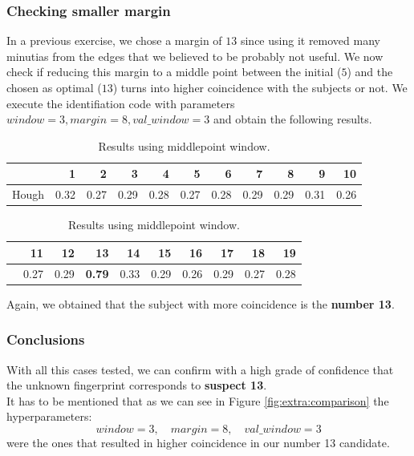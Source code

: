 \documentclass[a4paper]{article}
\begin{document}
\subsubsection{Checking smaller margin}

In a previous exercise, we chose a margin of \(13\) since using it removed many minutias from the edges that we believed to be probably not useful. We now check if reducing this margin to a middle point between the initial  (\(5\)) and the chosen as optimal (\(13\)) turns into higher coincidence with the subjects or not. We execute the identifiation code with parameters \(window = 3, margin = 8, val\_window = 3 \) and obtain the following results.

\begin{table}[H]
  \centering
  \begin{tabular}{lrrrrrrrrrr}

    {} &    1  &    2  &    3  &    4  &    5  &    6  &    7  &    8  &    9  &    10 \\
    \midrule
    Hough &  0.32 &  0.27 &  0.29 &  0.28 &  0.27 &  0.28 &  0.29 &  0.29 &  0.31 &  0.26 \\

    \end{tabular}
    
    \begin{tabular}{lrrrrrrrrr}

    {} &    11 &    12 &    13 &    14 &    15 &    16 &    17 &    18 &    19 \\
    \midrule
     &  0.27 &  0.29 &  \textbf{0.79} &  0.33 &  0.29 &  0.26 &  0.29 &  0.27 &  0.28 \\

    \end{tabular}
  \caption{Results using middlepoint window.}
\end{table}

Again, we obtained that the subject with more coincidence is the \textbf{number 13}.

\subsubsection{Conclusions}

With all this cases tested, we can confirm with a high grade of confidence that the unknown fingerprint corresponds to \textbf{suspect 13}.\\

It has to be mentioned that as we can see in Figure \ref{fig:extra:comparison} the hyperparameters:
\[
window = 3, \quad margin = 8, \quad val\_window = 3  
\]
were the ones that resulted in higher coincidence in our number 13 candidate.
\end{document}
